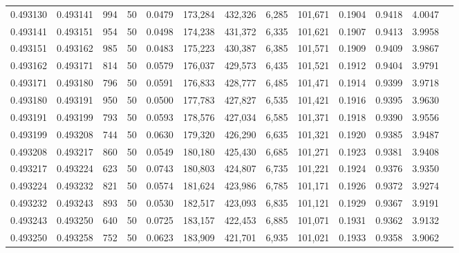 \begin{tabular}{rrrrrrrrrrrrr}
0.493130 & 0.493141 &   994 &  50 &                                     0.0479 & 173,284 & 432,326 &   6,285 & 101,671 & 0.1904 & 0.9418 & 4.0047 \\
0.493141 & 0.493151 &   954 &  50 &                                     0.0498 & 174,238 & 431,372 &   6,335 & 101,621 & 0.1907 & 0.9413 & 3.9958 \\
0.493151 & 0.493162 &   985 &  50 &                                     0.0483 & 175,223 & 430,387 &   6,385 & 101,571 & 0.1909 & 0.9409 & 3.9867 \\
0.493162 & 0.493171 &   814 &  50 &                                     0.0579 & 176,037 & 429,573 &   6,435 & 101,521 & 0.1912 & 0.9404 & 3.9791 \\
0.493171 & 0.493180 &   796 &  50 &                                     0.0591 & 176,833 & 428,777 &   6,485 & 101,471 & 0.1914 & 0.9399 & 3.9718 \\
0.493180 & 0.493191 &   950 &  50 &                                     0.0500 & 177,783 & 427,827 &   6,535 & 101,421 & 0.1916 & 0.9395 & 3.9630 \\
0.493191 & 0.493199 &   793 &  50 &                                     0.0593 & 178,576 & 427,034 &   6,585 & 101,371 & 0.1918 & 0.9390 & 3.9556 \\
0.493199 & 0.493208 &   744 &  50 &                                     0.0630 & 179,320 & 426,290 &   6,635 & 101,321 & 0.1920 & 0.9385 & 3.9487 \\
0.493208 & 0.493217 &   860 &  50 &                                     0.0549 & 180,180 & 425,430 &   6,685 & 101,271 & 0.1923 & 0.9381 & 3.9408 \\
0.493217 & 0.493224 &   623 &  50 &                                     0.0743 & 180,803 & 424,807 &   6,735 & 101,221 & 0.1924 & 0.9376 & 3.9350 \\
0.493224 & 0.493232 &   821 &  50 &                                     0.0574 & 181,624 & 423,986 &   6,785 & 101,171 & 0.1926 & 0.9372 & 3.9274 \\
0.493232 & 0.493243 &   893 &  50 &                                     0.0530 & 182,517 & 423,093 &   6,835 & 101,121 & 0.1929 & 0.9367 & 3.9191 \\
0.493243 & 0.493250 &   640 &  50 &                                     0.0725 & 183,157 & 422,453 &   6,885 & 101,071 & 0.1931 & 0.9362 & 3.9132 \\
0.493250 & 0.493258 &   752 &  50 &                                     0.0623 & 183,909 & 421,701 &   6,935 & 101,021 & 0.1933 & 0.9358 & 3.9062 \\

\end{tabular}
